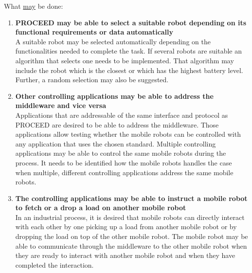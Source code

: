 What \underline{may} be done:
\begin{enumerate}  
   \item \textbf{PROCEED may be able to select a suitable robot depending on its functional requirements or data automatically} \hfill \\ 
	A suitable robot may be selected automatically depending on the functionalities needed to complete the task. If several robots are suitable an algorithm that selects one needs to be implemented. That algorithm may include the robot which is the closest or which has the highest battery level. Further, a random selection may also be suggested.
   \item \textbf{Other controlling applications may be able to address the middleware and vice versa} \hfill \\ 
	Applications that are addressable of the same interface and protocol as PROCEED are desired to be able to address the middleware. Those applications allow testing whether the mobile robots can be controlled with any application that uses the chosen standard. Multiple controlling applications may be able to control the same mobile robots during the process. It needs to be identified how the mobile robots handles the case when multiple, different controlling applications address the same mobile robots.
   \item \textbf{The controlling applications may be able to instruct a mobile robot to fetch or a drop a load on another mobile robot} \hfill \\ 
	In an industrial process, it is desired that mobile robots can directly interact with each other by one picking up a load from another mobile robot or by dropping the load on top of the other mobile robot. The mobile robot may be able to communicate through the middleware to the other mobile robot when they are ready to interact with another mobile robot and when they have completed the interaction.
\end{enumerate}


